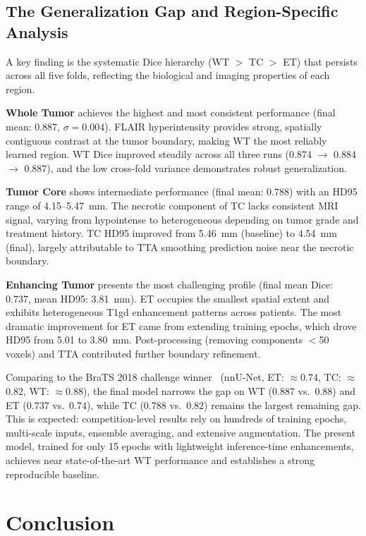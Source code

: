 \documentclass[10pt,twocolumn]{article}
\begin{document}
\subsection{The Generalization Gap and Region-Specific Analysis}

A key finding is the systematic Dice hierarchy (WT $>$ TC $>$
ET) that persists across all five folds, reflecting the
biological and imaging properties of each region.

\textbf{Whole Tumor} achieves the highest and most consistent
performance (final mean: 0.887, $\sigma = 0.004$). FLAIR
hyperintensity provides strong, spatially contiguous contrast at
the tumor boundary, making WT the most reliably learned region.
WT Dice improved steadily across all three runs (0.874
$\rightarrow$ 0.884 $\rightarrow$ 0.887), and the low
cross-fold variance demonstrates robust generalization.

\textbf{Tumor Core} shows intermediate performance (final mean:
0.788) with an HD95 range of 4.15--5.47~mm. The necrotic
component of TC lacks consistent MRI signal, varying from
hypointense to heterogeneous depending on tumor grade and
treatment history. TC HD95 improved from 5.46~mm (baseline)
to 4.54~mm (final), largely attributable to TTA smoothing
prediction noise near the necrotic boundary.

\textbf{Enhancing Tumor} presents the most challenging profile
(final mean Dice: 0.737, mean HD95: 3.81~mm). ET occupies the
smallest spatial extent and exhibits heterogeneous T1gd
enhancement patterns across patients. The most dramatic
improvement for ET came from extending training epochs, which
drove HD95 from 5.01 to 3.80~mm. Post-processing (removing
components $<$50 voxels) and TTA contributed further boundary
refinement.

Comparing to the BraTS 2018 challenge
winner~\cite{isensee2021} (nnU-Net, ET: $\approx$0.74, TC:
$\approx$0.82, WT: $\approx$0.88), the final model narrows the
gap on WT (0.887 vs.\ 0.88) and ET (0.737 vs.\ 0.74), while
TC (0.788 vs.\ 0.82) remains the largest remaining gap. This
is expected: competition-level results rely on hundreds of
training epochs, multi-scale inputs, ensemble averaging, and
extensive augmentation. The present model, trained for only 15
epochs with lightweight inference-time enhancements, achieves
near state-of-the-art WT performance and establishes a strong
reproducible baseline.

\section{Conclusion}
\end{document}

